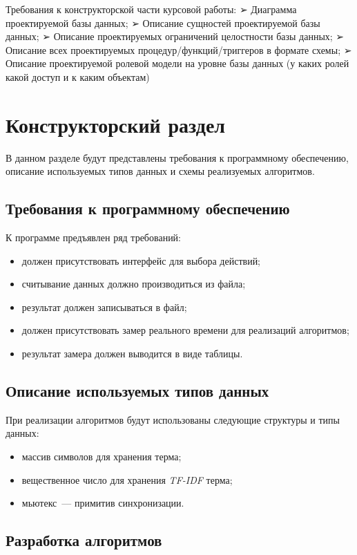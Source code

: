 Требования к конструкторской части курсовой работы:
➢ Диаграмма проектируемой базы данных;
➢ Описание сущностей проектируемой базы данных;
➢ Описание проектируемых ограничений целостности базы данных;
➢ Описание всех проектируемых процедур/функций/триггеров в формате схемы;
➢ Описание проектируемой ролевой модели на уровне базы данных (у каких ролей какой
доступ и к каким объектам)
\fi
\chapter{Конструкторский раздел}

В данном разделе будут представлены требования к программному обеспечению, описание используемых типов данных и схемы реализуемых алгоритмов.

\section{Требования к программному обеспечению}

К программе предъявлен ряд требований:
\begin{itemize}
	\item должен присутствовать интерфейс для выбора действий;
	\item считывание данных должно производиться из файла;
	\item результат должен записываться в файл;
	\item должен присутствовать замер реального времени для реализаций
алгоритмов;
	\item результат замера должен выводится в виде таблицы.
\end{itemize}

\section{Описание используемых типов данных}

При реализации алгоритмов будут использованы следующие структуры и типы данных:
\begin{itemize}
	\item массив символов для хранения терма;
	\item вещественное число для хранения \textit{TF-IDF} терма;
	\item мьютекс~--- примитив синхронизации.
\end{itemize}

\section{Разработка алгоритмов}

